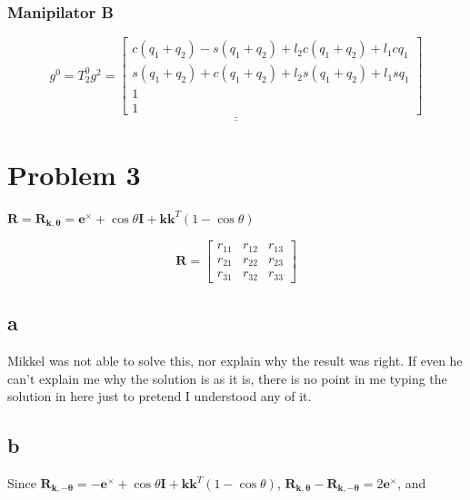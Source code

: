 \documentclass{article}
\begin{document}
\subsubsection*{Manipilator B}
\begin{equation*}
    \underline{\underline{g^0 = T^0_2g^2 =
        \begin{bmatrix}
        c (q_1 + q_2) - s (q_1 + q_2) + l_2 c (q_1 + q_2) + l_1 c q_1 \\
        s (q_1 + q_2) + c (q_1 + q_2)   + l_2 s (q_1 + q_2) + l_1 s q_1 \\
        1        \\
        1
        \end{bmatrix}}}
\end{equation*}

\section{Problem 3}

$\mathbf{R} = \mathbf{R_{\mathbf{k},\theta}} = \mathbf{e}^\times + \cos\theta\mathbf{I} + \mathbf{kk}^T(1-\cos\theta)$

\begin{equation*}
    \mathbf{R} = 
    \begin{bmatrix}
    r_{11} & r_{12} & r_{13} \\
    r_{21} & r_{22} & r_{23} \\
    r_{31} & r_{32} & r_{33}
    \end{bmatrix}
\end{equation*}


\subsection{a}

Mikkel was not able to solve this, nor explain why the result was right. If even he can't explain me why the solution is as it is, there is no point in me typing the solution in here just to pretend I understood any of it.

\subsection{b}

Since $\mathbf{R_{\mathbf{k},-\theta}} = -\mathbf{e}^\times + \cos\theta\mathbf{I} + \mathbf{kk}^T(1-\cos\theta)$, $\mathbf{R_{\mathbf{k},\theta}} - \mathbf{R_{\mathbf{k},-\theta}} = 2\mathbf{e}^\times$, and 
\end{document}
